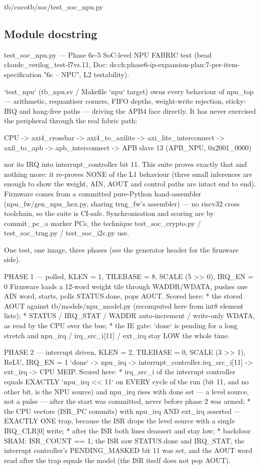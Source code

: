 \begin{relocated}{tb/cocotb/soc/test_soc_npu.py}

\subsection*{Module docstring}

\begin{textblock}
test_soc_npu.py — Phase 6c-5 SoC-level NPU FABRIC test (bead claude_verilog_test-f7vs.11,
Doc: ds:ch:phase6-ip-expansion-plan:7-per-item-specification "6c -- NPU", L2 testability).

`test_npu` (tb_npu.sv / Makefile `npu` target) owns every behaviour of npu_top — arithmetic,
requantiser corners, FIFO depths, weight-write rejection, sticky-IRQ and hang-free paths — driving
the APB4 face directly. It has never exercised the peripheral through the real fabric path:

CPU -> axi4_crossbar -> axi4_to_axilite -> axi_lite_interconnect ->
axil_to_apb -> apb_interconnect -> APB slave 13 (APB_NPU, 0x2001_0000)

nor its IRQ into interrupt_controller bit 11. This suite proves exactly that and nothing more: it
re-proves NONE of the L1 behaviour (three small inferences are enough to show the weight, AIN, AOUT
and control paths are intact end to end). Firmware comes from a committed pure-Python
hand-assembler (npu_fw/gen_npu_hex.py, sharing trng_fw's assembler) — no riscv32 cross toolchain,
so the suite is CI-safe. Synchronisation and scoring are by commit_pc_o marker PCs, the technique
test_soc_crypto.py / test_soc_trng.py / test_soc_i2c.py use.

One test, one image, three phases (see the generator header for the firmware side).

PHASE 1 — polled, KLEN = 1, TILEBASE = 8, SCALE (5 >> 0), IRQ_EN = 0
Firmware loads a 12-word weight tile through WADDR/WDATA, pushes one AIN word, starts, polls
STATUS.done, pops AOUT. Scored here:
* the stored AOUT against tb/models/npu_model.py (recomputed here from int8 element lists);
* STATUS / IRQ_STAT / WADDR auto-increment / write-only WDATA, as read by the CPU over the bus;
* the IE gate: `done` is pending for a long stretch and npu_irq / irq_src_i[11] / ext_irq stay
LOW the whole time.

PHASE 2 — interrupt driven, KLEN = 2, TILEBASE = 0, SCALE (3 >> 1), ReLU, IRQ_EN = 1
`done` -> npu_irq -> interrupt_controller.irq_src_i[11] -> ext_irq -> CPU MEIP. Scored here:
* irq_src_i of the interrupt controller equals EXACTLY `npu_irq << 11` on EVERY cycle of the
run (bit 11, and no other bit, is the NPU source) and npu_irq rises with done set — a level
source, not a pulse — after the start was committed, never before phase 2 was armed;
* the CPU vectors (ISR_PC commits) with npu_irq AND ext_irq asserted — EXACTLY ONE trap, because
the ISR drops the level source with a single IRQ_CLR[0] write;
* after the ISR both lines deassert and stay low;
* backdoor SRAM: ISR_COUNT == 1, the ISR saw STATUS.done and IRQ_STAT, the interrupt
controller's PENDING_MASKED bit 11 was set, and the AOUT word read after the trap equals the
model (the ISR itself does not pop AOUT).


\end{textblock}
\end{relocated}

